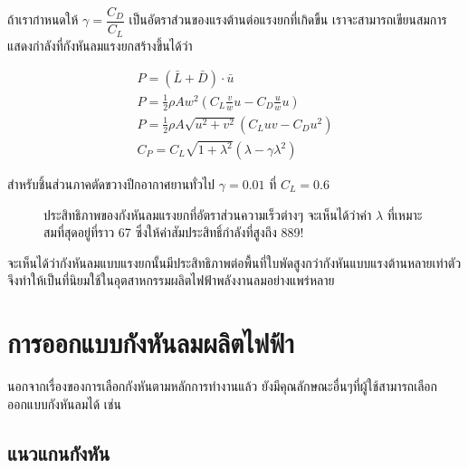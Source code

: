 \message{ !name(solar.tex)}\documentclass[
a4paper,
svgnames,
openany,
justified,
]{tufte-book}
\begin{document}
  ถ้าเรากำหนดให้ $\gamma = \dfrac{C_D}{C_L}$ เป็นอัตราส่วนของแรงต้านต่อแรงยกที่เกิดขึ้น เราจะสามารถเขียนสมการแสดงกำลังที่กังหันลมแรงยกสร้างขึ้นได้ว่า

  \begin{gather}
    P = (\bar{L} + \bar{D}) \cdot \bar{u} \nonumber \\
    P = \frac{1}{2}\rho A w^2 (C_L \frac{v}{w} u - C_D \frac{u}{w}u) \nonumber \\
    P = \frac{1}{2}\rho A \sqrt{u^2 + v^2} \left( C_L u v - C_D u^2 \right) \nonumber \\
     C_P = C_L \sqrt{1+\lambda^2} \left( \lambda - \gamma \lambda^2 \right) 
  \end{gather}

  สำหรับชิ้นส่วนภาคตัดขวางปีกอากาศยานทั่วไป $\gamma =  0.01$ ที่ $C_L = 0.6$

  \begin{figure}[h]
  \label{fig:power coeff lift-based turbine}
  \caption{ประสิทธิภาพของกังหันลมแรงยกที่อัตราส่วนความเร็วต่างๆ จะเห็นได้ว่าค่า $\lambda$ ที่เหมาะสมที่สุดอยู่ที่ราว 67 ซึ่งให้ค่าสัมประสิทธิ์กำลังที่สูงถึง 889!}
\end{figure}

จะเห็นได้ว่ากังหันลมแบบแรงยกนั้นมีประสิทธิภาพต่อพื้นที่ใบพัดสูงกว่ากังหันแบบแรงต้านหลายเท่าตัว จึงทำให้เป็นที่นิยมใช้ในอุตสาหกรรมผลิตไฟฟ้าพลังงานลมอย่างแพร่หลาย

\section{การออกแบบกังหันลมผลิตไฟฟ้า}

นอกจากเรื่องของการเลือกกังหันตามหลักการทำงานแล้ว ยังมีคุณลักษณะอื่นๆที่ผู้ใช้สามารถเลือกออกแบบกังหันลมได้ เช่น

\subsection{แนวแกนกังหัน}
\end{document}
